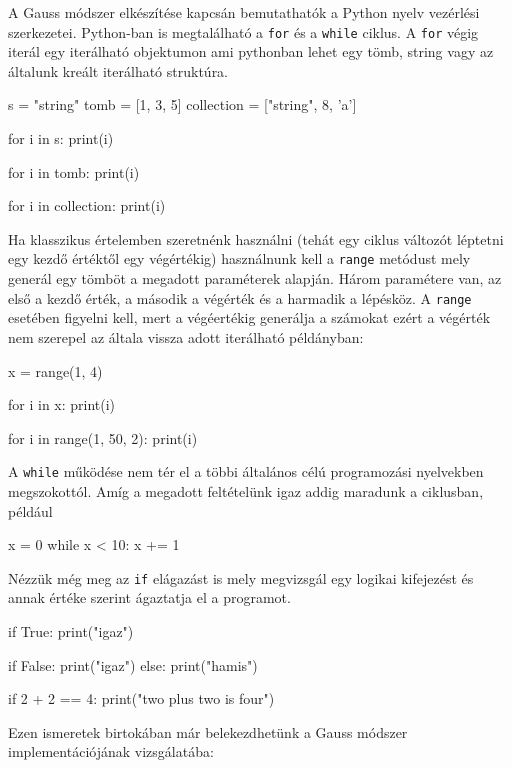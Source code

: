A Gauss módszer elkészítése kapcsán bemutathatók a Python nyelv vezérlési szerkezetei.
Python-ban is megtalálható a \texttt{for} és a \texttt{while} ciklus. A
\texttt{for} végig iterál egy iterálható objektumon ami pythonban lehet
egy tömb, string vagy az általunk kreált iterálható struktúra.
\begin{python}
s = "string"
tomb = [1, 3, 5]
collection = ["string", 8, 'a']

for i in s:
    print(i)

for i in tomb:
    print(i)

for i in collection:
    print(i)
\end{python}
    Ha klasszikus értelemben szeretnénk használni (tehát egy ciklus változót
léptetni egy kezdő értéktől egy végértékig) használnunk kell a
\texttt{range} metódust mely generál egy tömböt a megadott paraméterek
alapján. Három paramétere van, az első a kezdő érték, a második a
végérték és a harmadik a lépésköz. A \texttt{range} esetében figyelni
kell, mert a végéertékig generálja a számokat ezért a végérték nem
szerepel az általa vissza adott iterálható példányban:
\begin{python}
x = range(1, 4)

for i in x: 
    print(i)

for i in range(1, 50, 2):
    print(i)
\end{python}
    A \texttt{while} működése nem tér el a többi általános célú programozási
nyelvekben megszokottól. Amíg a megadott feltételünk igaz addig maradunk a
ciklusban, például
\begin{python}
x = 0
while x < 10:
    x += 1
\end{python}
    Nézzük még meg az \texttt{if} elágazást is mely megvizsgál egy logikai
kifejezést és annak értéke szerint ágaztatja el a programot.
\begin{python}
if True:
    print("igaz")
    
if False:
    print("igaz")
else:
    print("hamis")
    
if 2 + 2 == 4:
    print("two plus two is four")
\end{python}
Ezen ismeretek birtokában már belekezdhetünk a Gauss módszer implementációjának vizsgálatába:
